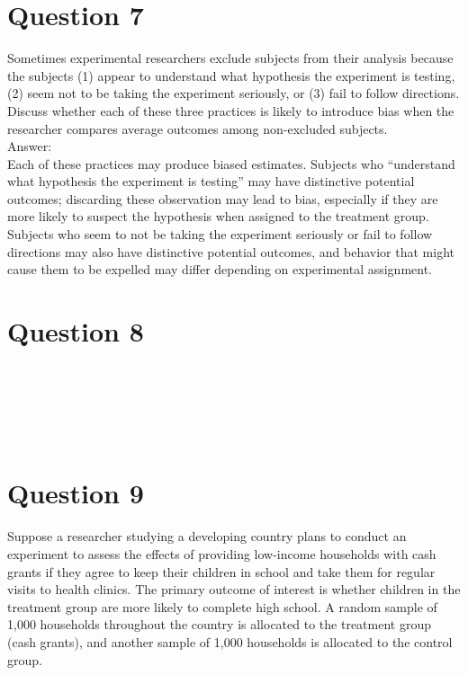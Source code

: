 \documentclass[11pt,notitlepage]{article}\usepackage[]{graphicx}\usepackage[]{color}
\makeatletter
\newenvironment{kframe}{%
 \def\at@end@of@kframe{}%
 \ifinner\ifhmode%
  \def\at@end@of@kframe{\end{minipage}}%
  \begin{minipage}{\columnwidth}%
 \fi\fi%
 \def\FrameCommand##1{\hskip\@totalleftmargin \hskip-\fboxsep
 \colorbox{shadecolor}{##1}\hskip-\fboxsep
     \hskip-\linewidth \hskip-\@totalleftmargin \hskip\columnwidth}%
 \MakeFramed {\advance\hsize-\width
   \@totalleftmargin\z@ \linewidth\hsize
   \@setminipage}}%
 {\par\unskip\endMakeFramed%
 \at@end@of@kframe}
\newenvironment{knitrout}{}{} %
\makeatother
\begin{document}
\section*{Question 7}
Sometimes experimental researchers exclude subjects from their analysis because the subjects (1) appear to understand what hypothesis the experiment is testing, (2) seem not to be taking the experiment seriously, or (3) fail to follow directions. Discuss whether each of these three practices is likely to introduce bias when the researcher compares average outcomes among non-excluded subjects.\\
Answer:\\
Each of these practices may produce biased estimates. Subjects who ``understand what hypothesis the experiment is testing'' may have distinctive potential outcomes; discarding these observation may lead to bias, especially if they are more likely to suspect the hypothesis when assigned to the treatment group. Subjects who seem to not be taking the experiment seriously or fail to follow directions may also have distinctive potential outcomes, and behavior that might cause them to be expelled may differ depending on experimental assignment.


\section*{Question 8}
\begin{knitrout}
\color{fgcolor}\begin{kframe}
\begin{verbatim}






\end{verbatim}
\end{kframe}
\end{knitrout}

\section*{Question 9}
Suppose a researcher studying a developing country plans to conduct an experiment to assess the effects of providing low-income households with cash grants if they agree to keep their children in school and take them for regular visits to health clinics. The primary outcome of interest is whether children in the treatment group are more likely to complete high school. A random sample of 1,000 households throughout the country is allocated to the treatment group (cash grants), and another sample of 1,000 households is allocated to the control group.
\end{document}
